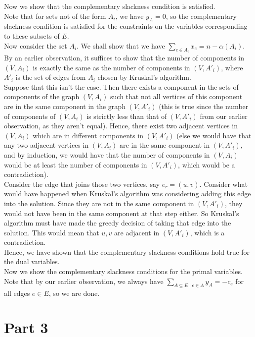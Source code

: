 \documentclass[a4paper]{article}
\newcommand{\nl}{\vspace{0.2cm}\\}
\begin{document}
Now we show that the complementary slackness condition is satisfied.\nl
Note that for sets not of the form $A_i$, we have $y_A = 0$, so the complementary slackness condition is satisfied for the constraints on the variables corresponding to these subsets of $E$.\nl
Now consider the set $A_i$. We shall show that we have $\sum_{e \in A_i} x_e = n - \alpha(A_i)$. By an earlier observation, it suffices to show that the number of components in $(V, A_i)$ is
exactly the same as the number of components in $(V, A'_i)$, where $A'_i$ is the set of edges from $A_i$ chosen by Kruskal's algorithm.\nl
Suppose that this isn't the case. Then there exists a
component in the sets of components of the graph $(V, A_i)$ such that not all vertices of this component are in the same component in the graph $(V, A'_i)$ (this is true since the number of
components of $(V, A_i)$ is strictly less than that of $(V, A'_i)$ from our earlier observation, as they aren't equal). Hence, there exist two adjacent
vertices in $(V, A_i)$ which are in different components in $(V, A'_i)$ (else we would have that any two adjacent vertices in $(V, A_i)$ are in the same component in $(V, A'_i)$, and by induction, we
would have that the number of components in $(V, A_i)$ would be at least the number of components in $(V, A'_i)$, which would be a contradiction).\nl
Consider the edge that joins those two vertices, say $e_r = (u, v)$. Consider what would have happened when Kruskal's algorithm was considering adding this edge into the solution. Since they are
not in the same component in $(V, A'_i)$, they would not have been in the same component at that step either. So Kruskal's algorithm must have made the greedy decision of taking that edge
into the solution. This would mean that $u, v$ are adjacent in $(V, A'_i)$, which is a contradiction.\nl
Hence, we have shown that the complementary slackness conditions hold true for the dual variables.\nl

Now we show the complementary slackness conditions for the primal variables.\nl
Note that by our earlier observation, we always have $\sum_{A \subseteq E \mid e \in A} y_A = -c_e$ for all edges $e \in E$, so we are done.

\section{Part 3}
\end{document}
